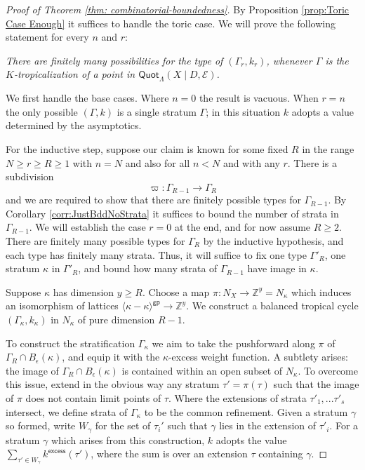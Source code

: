 \documentclass[11pt]{amsart}
\theoremstyle{definition}
\theoremstyle{definition}
\begin{document}
\begin{proof}[Proof of Theorem \ref{thm: combinatorial-boundedness}]
    By Proposition \ref{prop:Toric Case Enough} it suffices to handle the toric case. We will prove the following statement for every $n$ and $r$:


\noindent
\textit{There are finitely many possibilities for the type of $(\Gamma_r, k_r)$, whenever $\Gamma$ is the $K$-tropicalization of a point in $\mathsf{Quot}_\Lambda(X \mid D, \mathcal{E})$.}

We first handle the base cases. Where $n=0$ the result is vacuous. When $r=n$ the only possible $(\Gamma,k)$ is a single stratum $\Gamma$; in this situation $k$ adopts a value determined by the asymptotics.

    For the inductive step, suppose our claim is known for some fixed $R$ in the range $N
\geq r\geq R\geq 1$ with $n=N$ and also for all $n< N$ and with any $r$. There is a subdivision $$\varpi\colon \Gamma_{R-1} \rightarrow \Gamma_{R}$$ and we are required to show that there are finitely possible types for $\Gamma_{R-1}$. By Corollary \ref{corr:JustBddNoStrata} it suffices to bound the number of strata in $\Gamma_{R-1}$. We will establish the case $r=0$ at the end, and for now assume $R\geq 2$. There are finitely many possible types for $\Gamma_{R}$ by the inductive hypothesis, and each type has finitely many strata. Thus, it will suffice to fix one type $\Gamma'_R$, one stratum $\kappa$ in $\Gamma'_R$, and bound how many strata of $\Gamma_{R-1}$ have image in $\kappa$.

    Suppose $\kappa$ has dimension $y\geq R$. Choose a map $\pi\colon N_X\rightarrow \mathbb{Z}^y = N_\kappa$ which induces an isomorphism of lattices $\langle\kappa-\kappa\rangle^\mathsf{gp}\rightarrow \mathbb{Z}^{y}$. We construct a balanced tropical cycle $(\Gamma_\kappa,k_\kappa)$ in $N_\kappa$ of pure dimension $R-1$.  

    To construct the stratification $\Gamma_\kappa$ we aim to take the pushforward along $\pi$ of $\Gamma_R\cap B_\epsilon(\kappa)$, and equip it with the $\kappa$-excess weight function. 
    A subtlety arises: the image of $\Gamma_R\cap B_\epsilon(\kappa)$ is contained within an open subset of $N_\kappa$. 
    To overcome this issue, extend in the obvious way any stratum $\tau'=\pi(\tau)$ such that the image of $\pi$ does not contain limit points of $\tau$. Where the extensions of strata 
    $\tau'_1,...\tau'_s$ intersect,
    we define strata of $\Gamma_\kappa$ to be the common refinement. Given a stratum $\gamma$ so formed, write $W_\gamma$ for the set of $\tau_i'$ such that $\gamma$ lies in the extension of $\tau'_i$. For a stratum $\gamma$ which arises from this construction, $k$ adopts the value $\sum_{\tau'\in {W_\gamma}} k^{\mathsf{excess}}(\tau')$, where the sum is over an extension $\tau$ containing $\gamma$.


\end{proof}
\end{document}
